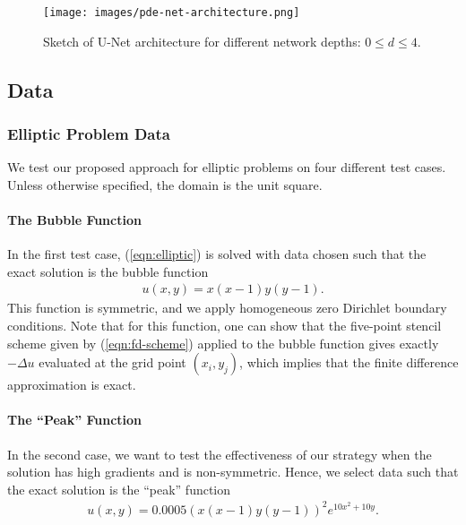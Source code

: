 \documentclass[preprint,12pt]{elsarticle}
\begin{document}
\begin{figure}[ht!]
    \centering
    \texttt{[image: images/pde-net-architecture.png]}
    \caption{Sketch of U-Net architecture for different network depths: $0\leq d\leq 4$. \label{fig:network}}
\end{figure}


\subsection{Data} \label{sec:data}

\subsubsection{Elliptic Problem Data} \label{sec:data-elliptic}
We test our proposed approach for elliptic problems on four different test cases.  Unless otherwise specified, the domain is the unit square. 


\paragraph{The Bubble Function} In the first test case, (\ref{eqn:elliptic}) is solved with data chosen such that the exact solution is the bubble function 
\begin{align}
    u(x, y) = x(x-1)y(y-1).
\end{align} 
This function is symmetric, and we apply homogeneous zero Dirichlet boundary conditions. Note that for this function, one can show that the five-point stencil scheme given by (\ref{eqn:fd-scheme}) applied to the bubble function gives exactly $-\Delta u$ evaluated at the grid point $(x_i, y_j)$, which implies that the finite difference approximation is exact.
\paragraph{The ``Peak'' Function} In the second case, we want to test the effectiveness of our strategy when the solution has high gradients and is non-symmetric. Hence, we select data such that the exact solution is the ``peak'' function
\begin{align}
    u(x, y) = 0.0005\left( x(x-1)y(y-1) \right)^2 e^{10x^2 + 10y}.
\end{align}
\end{document}
